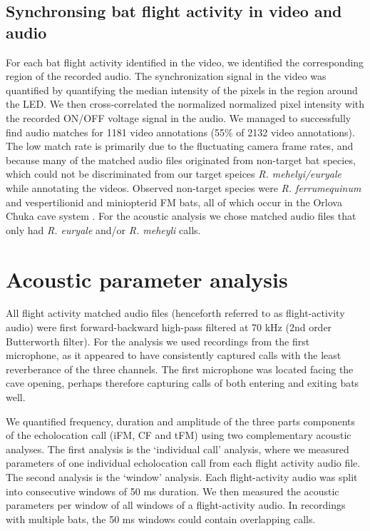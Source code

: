 \documentclass[
]{book}
\begin{document}
\hypertarget{synchronsing-bat-flight-activity-in-video-and-audio}{%
\subsection{Synchronsing bat flight activity in video and audio}\label{synchronsing-bat-flight-activity-in-video-and-audio}}

For each bat flight activity identified in the video, we identified the corresponding region of the recorded audio. The synchronization signal in the video was quantified by quantifying the median intensity of the pixels in the region around the LED. We then cross-correlated the normalized normalized pixel intensity with the recorded ON/OFF voltage signal in the audio. We managed to successfully find audio matches for 1181 video annotations (55\% of 2132 video annotations). The low match rate is primarily due to the fluctuating camera frame rates, and because many of the matched audio files originated from non-target bat species, which could not be discriminated from our target speices \emph{R. mehelyi/euryale} while annotating the videos. Observed non-target species were \emph{R. ferrumequinum} and vespertilionid and miniopterid FM bats, all of which occur in the Orlova Chuka cave system \citep{ivanova2005important}. For the acoustic analysis we chose matched audio files that only had \emph{R. euryale} and/or \emph{R. meheyli} calls.

\hypertarget{acoustic-parameter-analysis}{%
\section{Acoustic parameter analysis}\label{acoustic-parameter-analysis}}

All flight activity matched audio files (henceforth referred to as flight-activity audio) were first forward-backward high-pass filtered at 70 kHz (2nd order Butterworth filter). For the analysis we used recordings from the first microphone, as it appeared to have consistently captured calls with the least reverberance of the three channels. The first microphone was located facing the cave opening, perhaps therefore capturing calls of both entering and exiting bats well.

We quantified frequency, duration and amplitude of the three parts components of the echolocation call (iFM, CF and tFM) using two complementary acoustic analyses. The first analysis is the `individual call' analysis, where we measured parameters of one individual echolocation call from each flight activity audio file. The second analysis is the `window' analysis. Each flight-activity audio was split into consecutive windows of 50 ms duration. We then measured the acoustic parameters per window of all windows of a flight-activity audio. In recordings with multiple bats, the 50 ms windows could contain overlapping calls.
\end{document}
